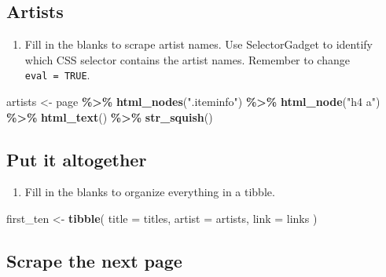 \documentclass[
]{article}
\newenvironment{Shaded}{\begin{snugshade}}{\end{snugshade}}
\newcommand{\AttributeTok}[1]{\textcolor[rgb]{0.13,0.29,0.53}{#1}}
\newcommand{\FunctionTok}[1]{\textcolor[rgb]{0.13,0.29,0.53}{\textbf{#1}}}
\newcommand{\NormalTok}[1]{#1}
\newcommand{\OtherTok}[1]{\textcolor[rgb]{0.56,0.35,0.01}{#1}}
\newcommand{\SpecialCharTok}[1]{\textcolor[rgb]{0.81,0.36,0.00}{\textbf{#1}}}
\newcommand{\StringTok}[1]{\textcolor[rgb]{0.31,0.60,0.02}{#1}}
\providecommand{\tightlist}{%
  \setlength{\itemsep}{0pt}\setlength{\parskip}{0pt}}
\begin{document}
\subsection{Artists}\label{artists}

\begin{enumerate}
\def\labelenumi{\arabic{enumi}.}
\setcounter{enumi}{1}
\tightlist
\item
  Fill in the blanks to scrape artist names. Use SelectorGadget to
  identify which CSS selector contains the artist names. Remember to
  change \texttt{eval\ =\ TRUE}.
\end{enumerate}

\begin{Shaded}
\begin{Highlighting}[]
\NormalTok{artists }\OtherTok{\textless{}{-}}\NormalTok{ page }\SpecialCharTok{\%\textgreater{}\%}
  \FunctionTok{html\_nodes}\NormalTok{(}\StringTok{".iteminfo"}\NormalTok{) }\SpecialCharTok{\%\textgreater{}\%}
  \FunctionTok{html\_node}\NormalTok{(}\StringTok{"h4 a"}\NormalTok{) }\SpecialCharTok{\%\textgreater{}\%}
  \FunctionTok{html\_text}\NormalTok{() }\SpecialCharTok{\%\textgreater{}\%}
  \FunctionTok{str\_squish}\NormalTok{()}
\end{Highlighting}
\end{Shaded}

\subsection{Put it altogether}\label{put-it-altogether}

\begin{enumerate}
\def\labelenumi{\arabic{enumi}.}
\setcounter{enumi}{2}
\tightlist
\item
  Fill in the blanks to organize everything in a tibble.
\end{enumerate}

\begin{Shaded}
\begin{Highlighting}[]
\NormalTok{first\_ten }\OtherTok{\textless{}{-}} \FunctionTok{tibble}\NormalTok{(}
  \AttributeTok{title =}\NormalTok{ titles,}
  \AttributeTok{artist =}\NormalTok{ artists,}
  \AttributeTok{link =}\NormalTok{ links}
\NormalTok{)}
\end{Highlighting}
\end{Shaded}

\subsection{Scrape the next page}\label{scrape-the-next-page}
\end{document}
